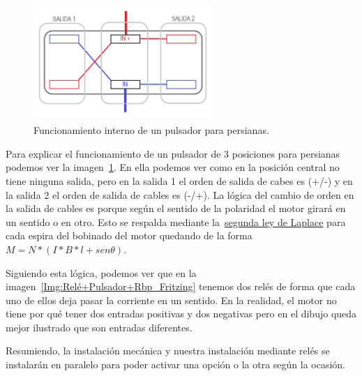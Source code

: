 \begin{figure}[h]
    \centering
    \includegraphics[width=0.6\textwidth]{img/Diagramas/PulsadorInterno.png}
    \caption{Funcionamiento interno de un pulsador para persianas.} \label{img:PulsadorInterno}
\end{figure}


Para explicar el funcionamiento de un pulsador de 3 posiciones para persianas podemos ver la imagen~\ref{img:PulsadorInterno}. En ella podemos ver como en la posición central no tiene ninguna salida, pero en la salida 1 el orden de salida de cabes es (+/-) y en la salida 2 el orden de salida de cables es (-/+). La lógica del cambio de orden en la salida de cables es porque según el sentido de la polaridad el motor girará en un sentido o en otro. Esto se respalda mediante la~\href{https://fisica.laguia2000.com/dinamica-clasica/fuerzas/ley-de-laplace-fuerza-ejercida-sobre-un-conductor}{segunda ley de Laplace} para cada espira del bobinado del motor quedando de la forma~\href{http://www.uco.es/grupos/giie/cirweb/teoria/tema_11/tema_11_01.pdf}{$M=N*(I*B*l+sen\theta)$}.

Siguiendo esta lógica, podemos ver que en la imagen~\ref{Img:Relé+Pulsador+Rbp_Fritzing} tenemos dos relés de forma que cada uno de ellos deja pasar la corriente en un sentido. En la realidad, el motor no tiene por qué tener dos entradas positivas y dos negativas pero en el dibujo queda mejor ilustrado que son entradas diferentes.

Resumiendo, la instalación mecánica y nuestra instalación mediante relés se instalarán en paralelo para poder activar una opción o la otra según la ocasión.

